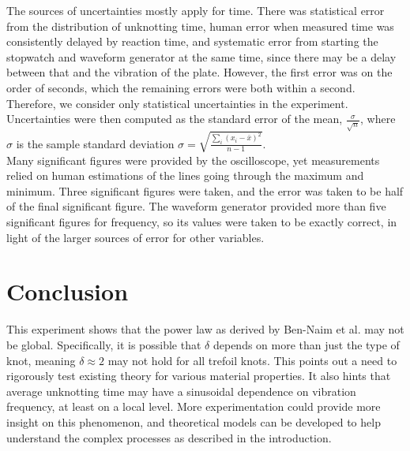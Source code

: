 \documentclass[12pt]{IEEEtran}
\begin{document}
The sources of uncertainties mostly apply for time. There was statistical error from the distribution of unknotting time, human error when measured time was consistently delayed by reaction time, and systematic error from starting the stopwatch and waveform generator at the same time, since there may be a delay between that and the vibration of the plate. However, the first error was on the order of seconds, which the remaining errors were both within a second. Therefore, we consider only statistical uncertainties in the experiment. Uncertainties were then computed as the standard error of the mean, $\frac{\sigma}{\sqrt{n}}$, where $\sigma$ is the sample standard deviation $\sigma = \sqrt{\frac{\sum_i (x_i - \bar x)^2}{n-1}}$. \\
Many significant figures were provided by the oscilloscope, yet measurements relied on human estimations of the lines going through the maximum and minimum. Three significant figures were taken, and the error was taken to be half of the final significant figure. The waveform generator provided more than five significant figures for frequency, so its values were taken to be exactly correct, in light of the larger sources of error for other variables.

\section{Conclusion}

This experiment shows that the power law as derived by Ben-Naim et al. may not be global. Specifically, it is possible that $\delta$ depends on more than just the type of knot, meaning $\delta \approx 2$ may not hold for all trefoil knots. This points out a need to rigorously test existing theory for various material properties. It also hints that average unknotting time may have a sinusoidal dependence on vibration frequency, at least on a local level. More experimentation could provide more insight on this phenomenon, and theoretical models can be developed to help understand the complex processes as described in the introduction.

{}

\end{document}
